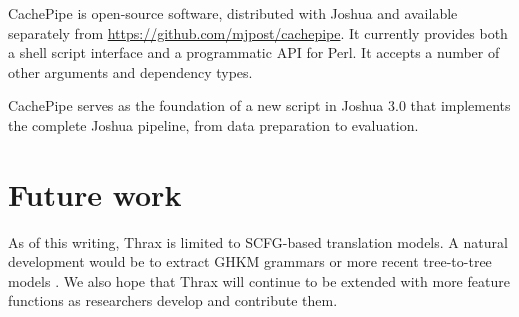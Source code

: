 \documentclass[11pt]{article}
\begin{document}
CachePipe is open-source software, distributed with Joshua
and available separately from
\url{https://github.com/mjpost/cachepipe}.  It currently provides both
a shell script interface and a programmatic API for Perl.  It accepts
a number of other arguments and dependency types.

CachePipe serves as the foundation of a new script in Joshua 3.0 that
implements the complete Joshua pipeline, from data preparation to
evaluation.

\section{Future work}

As of this writing, Thrax is limited to SCFG-based translation models.
A natural development would be to extract GHKM grammars
\cite{galley2004whats} or more recent tree-to-tree models
\cite{zhang2008,liu2009,chiang2010}.  We also hope that Thrax will
continue to be extended with more feature functions as researchers
develop and contribute them.




\end{document}
